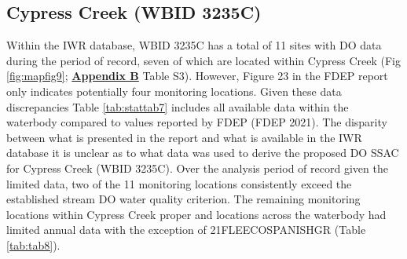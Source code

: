 \documentclass[]{interact}
\theoremstyle{plain}%
\theoremstyle{definition}
\theoremstyle{remark}
\begin{document}
\hypertarget{cypress-creek-wbid-3235c}{%
\subsection{Cypress Creek (WBID 3235C)}\label{cypress-creek-wbid-3235c}}

Within the IWR database, WBID 3235C has a total of 11 sites with DO data
during the period of record, seven of which are located within Cypress
Creek (Fig \ref{fig:mapfig9};
\textbf{\protect\hyperlink{appendix-b}{Appendix B}} Table S3). However,
Figure 23 in the FDEP report only indicates potentially four monitoring
locations. Given these data discrepancies Table \ref{tab:stattab7}
includes all available data within the waterbody compared to values
reported by FDEP (FDEP 2021). The disparity between what is presented in
the report and what is available in the IWR database it is unclear as to
what data was used to derive the proposed DO SSAC for Cypress Creek
(WBID 3235C). Over the analysis period of record given the limited data,
two of the 11 monitoring locations consistently exceed the established
stream DO water quality criterion. The remaining monitoring locations
within Cypress Creek proper and locations across the waterbody had
limited annual data with the exception of 21FLEECOSPANISHGR (Table
\ref{tab:tab8}).

\begin{table}[H]

\caption{\label{tab:unnamed-chunk-14}\label{tab:stattab7} Summary statisic of dissolved oxygen (DO) saturation for Cypress Creek (WBID 3235C) during the period of record (Calendar Year: 2006 - 2020) as reported by FDEP (2021) and summaried data (this report)}
\centering
{}
\end{table}
\end{document}
